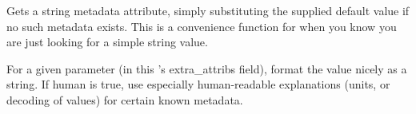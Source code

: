 Gets a string metadata attribute, simply substituting the supplied
default value if no such metadata exists.  This is a convenience
function for when you know you are just looking for a simple string value.
\apiend


For a given parameter (in this \ImageSpec's {\cf extra_attribs} field),
format the value nicely as a string.  If {\cf human} is true, use
especially human-readable explanations (units, or decoding of
values) for certain known metadata.
\apiend



\chapwidthend
